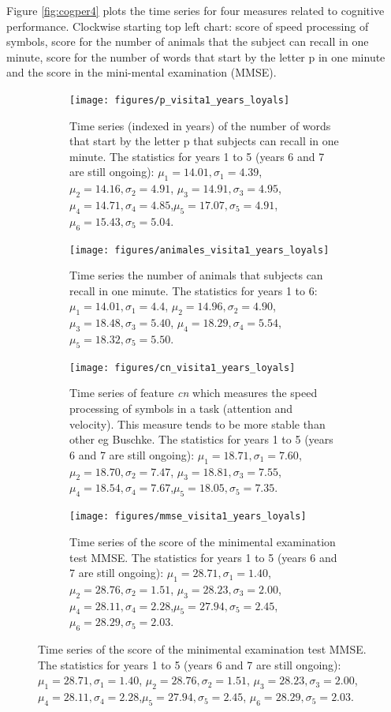\documentclass[11pt]{article}
\theoremstyle{definition}
\theoremstyle{remark}
\begin{document}
Figure \ref{fig:cogper4} plots the time series for four measures related to cognitive performance. Clockwise starting top left chart: score of speed processing of symbols, score for the number of animals that the subject can recall in one minute, score for the number of words that start by the letter p in one minute and the score in the mini-mental examination (MMSE).

\begin{figure}[H]
    \centering
    \begin{subfigure}[t]{0.45\textwidth}
        \centering
        \texttt{[image: figures/p\_visita1\_years\_loyals]}
        \caption{Time series (indexed in years) of the  number of words that start by the letter p that subjects can recall in one minute. The statistics for years 1 to 5 (years 6 and 7 are still ongoing): $\mu_{1}=14.01, \sigma_{1}=4.39$, $\mu_{2}=14.16, \sigma_{2}=4.91$, $\mu_{3}=14.91, \sigma_{3}=4.95$, $\mu_{4}=14.71, \sigma_{4}=4.85$,$\mu_{5}=17.07,\sigma_{5}=4.91$, $\mu_{6}=15.43,\sigma_{5}=5.04$.}
    \end{subfigure}
    \hfill
    \begin{subfigure}[t]{0.45\textwidth}
        \centering
        \texttt{[image: figures/animales\_visita1\_years\_loyals]}
        \caption{Time series the  number of animals that subjects can recall in one minute. The statistics for years 1 to 6: $\mu_{1}=14.01, \sigma_{1}=4.4$, $\mu_{2}=14.96, \sigma_{2}=4.90$, $\mu_{3}=18.48, \sigma_{3}=5.40$, $\mu_{4}=18.29, \sigma_{4}=5.54$,$\mu_{5}=18.32,\sigma_{5}=5.50$.}
    \end{subfigure}%
    
     \begin{subfigure}[t]{0.45\textwidth}
        \centering
        \texttt{[image: figures/cn\_visita1\_years\_loyals]}
        \caption{Time series of feature \emph{cn} which measures the speed processing of symbols in a task (attention and velocity). This measure tends to be more stable than other eg Buschke. The statistics for years 1 to 5 (years 6 and 7 are still ongoing): $\mu_{1}=18.71, \sigma_{1}=7.60$, $\mu_{2}=18.70, \sigma_{2}=7.47$, $\mu_{3}=18.81, \sigma_{3}=7.55$, $\mu_{4}=18.54, \sigma_{4}=7.67$,$\mu_{5}=18.05,\sigma_{5}=7.35$.}
    \end{subfigure}
    \hfill
    \begin{subfigure}[t]{0.45\textwidth}
        \centering
        \texttt{[image: figures/mmse\_visita1\_years\_loyals]}
        \caption{Time series of the score of the minimental examination test MMSE. The statistics for years 1 to 5 (years 6 and 7 are still ongoing): $\mu_{1}=28.71, \sigma_{1}=1.40$, $\mu_{2}=28.76, \sigma_{2}=1.51$, $\mu_{3}=28.23, \sigma_{3}=2.00$, $\mu_{4}=28.11, \sigma_{4}=2.28$,$\mu_{5}=27.94,\sigma_{5}=2.45$, $\mu_{6}=28.29,\sigma_{5}=2.03$.}
    \end{subfigure}%
   

\end{figure}
\end{document}
